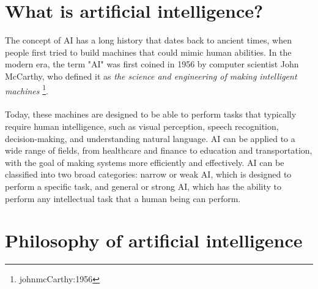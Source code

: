 \section{What is artificial intelligence?}
The concept of AI has a long history that dates back to ancient times, when people first tried to build machines that could mimic human abilities. In the modern era, the term "AI" was first coined in 1956 by computer scientist John McCarthy, who defined it as \textit{the science and engineering of making intelligent machines} \footnote{johnmcCarthy:1956}.
\\
\\
Today, these machines are designed to be able to perform tasks that typically require human intelligence, such as visual perception, speech recognition, decision-making, and understanding natural language. AI can be applied to a wide range of fields, from healthcare and finance to education and transportation, with the goal of making systems more efficiently and effectively. AI can be classified into two broad categories: narrow or weak AI, which is designed to perform a specific task, and general or strong AI, which has the ability to perform any intellectual task that a human being can perform.

\section{Philosophy of artificial intelligence}

